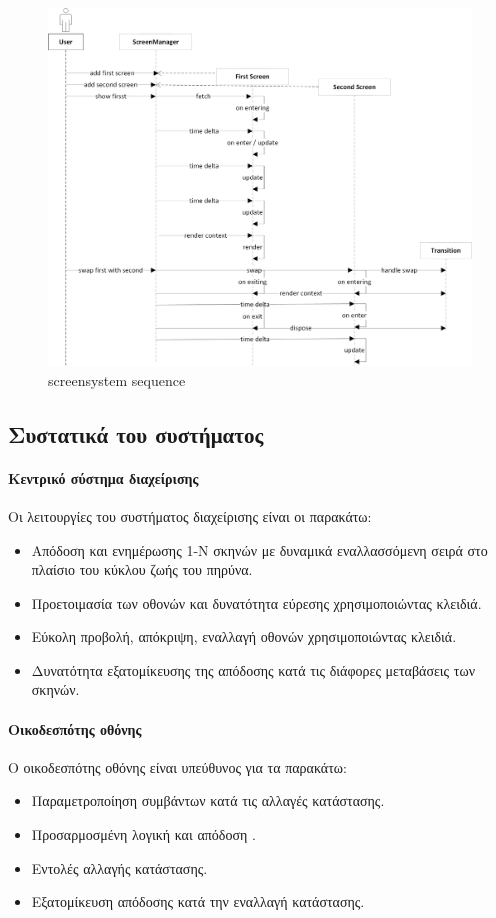 	\begin{figure}[h!]
		\centering
		\includegraphics[width=165mm]{Images/screensystem_sequence}
		\caption{screensystem sequence}
		\label{fig:screensystem_sequence}
	\end{figure}	
	
	\subsection{Συστατικά του συστήματος}		
	\paragraph{Κεντρικό σύστημα διαχείρισης}
	Οι λειτουργίες του συστήματος διαχείρισης είναι οι παρακάτω:
	\begin{itemize}
	\item Απόδοση και ενημέρωσης 1-N σκηνών με δυναμικά εναλλασσόμενη σειρά στο πλαίσιο του κύκλου ζωής του πηρύνα.
	\item Προετοιμασία των οθονών και δυνατότητα εύρεσης χρησιμοποιώντας κλειδιά.
	\item Εύκολη προβολή, απόκριψη, εναλλαγή οθονών χρησιμοποιώντας κλειδιά.
	\item Δυνατότητα εξατομίκευσης της απόδοσης κατά τις διάφορες μεταβάσεις των σκηνών.
	\end{itemize}

	\paragraph{Οικοδεσπότης οθόνης}
	Ο οικοδεσπότης οθόνης είναι υπεύθυνος για τα παρακάτω:
	\begin{itemize}
		\item Παραμετροποίηση συμβάντων κατά τις αλλαγές κατάστασης.
		\item Προσαρμοσμένη λογική και απόδοση .
		\item Εντολές αλλαγής κατάστασης.
		\item Εξατομίκευση απόδοσης κατά την εναλλαγή κατάστασης.
	\end{itemize}
	
